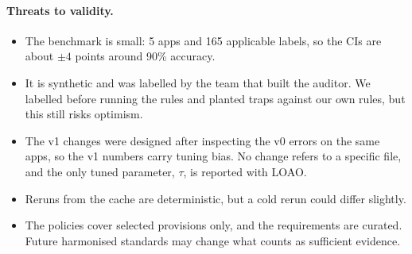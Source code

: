 \paragraph{Threats to validity.}
\begin{itemize}[leftmargin=*]
  \item The benchmark is small: 5 apps and 165 applicable labels, so the CIs are about $\pm4$ points around 90\%
        accuracy.
  \item It is synthetic and was labelled by the team that built the auditor. We labelled before running the rules and
        planted traps against our own rules, but this still risks optimism.
  \item The v1 changes were designed after inspecting the v0 errors on the same apps, so the v1 numbers carry tuning
        bias. No change refers to a specific file, and the only tuned parameter, $\tau$, is reported with LOAO.
  \item Reruns from the cache are deterministic, but a cold rerun could differ slightly.
  \item The policies cover selected provisions only, and the requirements are curated. Future harmonised standards may
        change what counts as sufficient evidence.
\end{itemize}
